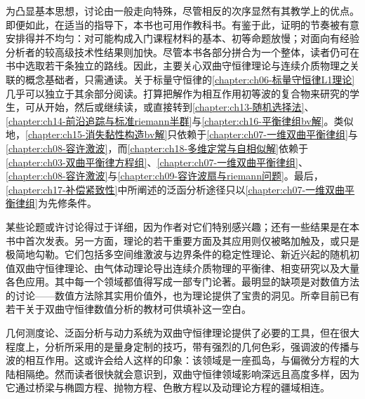 \documentclass[../../main.tex]{subfiles}
\begin{document}
为凸显基本思想，讨论由一般走向特殊，尽管相反的次序显然有其教学上的优点。即便如此，在适当的指导下，本书也可用作教科书。有鉴于此，证明的节奏被有意安排得并不均匀：对可能构成入门课程材料的基本、初等命题放慢；对面向有经验分析者的较高级技术性结果则加快。尽管本书各部分拼合为一个整体，读者仍可在书中选取若干条独立的路线。因此，主要关心双曲守恒律理论与连续介质物理之关联的概念基础者，只需通读。关于标量守恒律的\cref{chapter:ch06-标量守恒律L1理论}几乎可以独立于其余部分阅读。打算把解作为相互作用初等波的复合物来研究的学生，可从开始，然后或继续读，或直接转到\cref{chapter:ch13-随机选择法}、\cref{chapter:ch14-前沿追踪与标准riemann半群}与\cref{chapter:ch16-平衡律组bv解}。类似地，\cref{chapter:ch15-消失黏性构造bv解}只依赖于\cref{chapter:ch07-一维双曲平衡律组}与\cref{chapter:ch08-容许激波}，而\cref{chapter:ch18-多维定常与自相似解}依赖于\cref{chapter:ch03-双曲平衡律方程组}、\cref{chapter:ch07-一维双曲平衡律组}、\cref{chapter:ch08-容许激波}与\cref{chapter:ch09-容许波扇与riemann问题}。最后，\cref{chapter:ch17-补偿紧致性}中所阐述的泛函分析途径只以\cref{chapter:ch07-一维双曲平衡律组}为先修条件。

某些论题或许讨论得过于详细，因为作者对它们特别感兴趣；还有一些结果是在本书中首次发表。另一方面，理论的若干重要方面及其应用则仅被略加触及，或只是极简地勾勒。它们包括多空间维激波与边界条件的稳定性理论、新近兴起的随机初值双曲守恒律理论、由气体动理论导出连续介质物理的平衡律、相变研究以及大量各色应用。其中每一个领域都值得写成一部专门论著。最明显的缺项是对数值方法的讨论——数值方法除其实用价值外，也为理论提供了宝贵的洞见。所幸目前已有若干关于双曲守恒律数值分析的教材可供填补这一空白。

几何测度论、泛函分析与动力系统为双曲守恒律理论提供了必要的工具，但在很大程度上，分析所采用的是量身定制的技巧，带有强烈的几何色彩，强调波的传播与波的相互作用。这或许会给人这样的印象：该领域是一座孤岛，与偏微分方程的大陆相隔绝。然而读者很快就会意识到，双曲守恒律领域影响深远且高度多样，因为它通过桥梁与椭圆方程、抛物方程、色散方程以及动理论方程的疆域相连。
\end{document}

